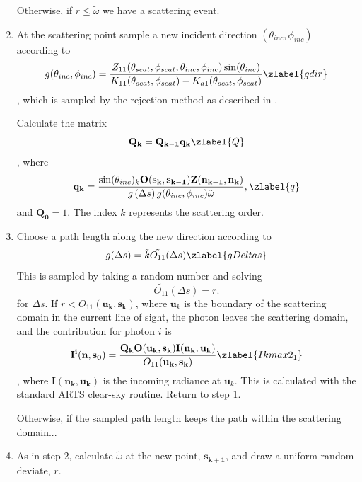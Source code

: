 \begin{enumerate}
Otherwise, if $r\le\tilde{\omega}$
we have a scattering event.
\item
At the scattering point sample a new incident direction
  $(\theta_{inc},\phi_{inc})$ according to 
\begin{equation}
g(\theta_{inc},\phi_{inc})=\frac{Z_{11}(\theta_{scat},\phi_{scat},
\theta_{inc},\phi_{inc})\sin(\theta_{inc})}{K_{11}(\theta_{scat},\phi_{scat})
  - K_{a1}(\theta_{scat},\phi_{scat})}
\zlabel{gdir}
\end{equation}
, which is
sampled by the rejection method as described in \cite{liu:01}.

Calculate the matrix
\begin{equation}
\mathbf{Q_k}=\mathbf{Q_{k-1}q_k}
\zlabel{Q}
\end{equation}
, where
\begin{equation}
\mathbf{q_k}=\frac{\sin(\theta_{inc})_k
  \mathbf{O(s_k,s_{k-1})}\mathbf{Z(n_{k-1},n_k)}}
  {g\left(\Delta s\right)g(\theta_{inc},\phi_{inc}) \tilde{\omega}} ,
\zlabel{q}
\end{equation}
and $\mathbf{Q_0}={1}$. The index $k$ represents the
scattering order.
\item
Choose a path length along the new direction according to
\begin{equation}
g(\Delta s)=\tilde{k}\tilde{O_{11}}(\Delta s)
\zlabel{gDeltas}
\end{equation}
This is sampled by taking a random number and solving 
\begin{equation}
\tilde{O_{11}}(\Delta s)=r.
\end{equation}
for $\Delta s$.
If $r<O_{11}(\mathbf{u_{k},s_k})$, where $\mathbf{u}_{k}$ is the
  boundary of the scattering domain in the current line of sight, the
  photon leaves the scattering domain, and the contribution for photon $i$ is
\begin{equation}
\mathbf{I^i(n,s_0)}=\frac{\mathbf{Q_k}\mathbf{O(u_k,s_k)I(n_k,u_k)}}{O_{11}(\mathbf{u_{k},s_k})}
\zlabel{Ikmax2_1}
\end{equation}
, where 
$\mathbf{I(n_k,u_k)}$ is the incoming radiance at $\mathbf{u}_{k}$.  This is calculated with the standard ARTS clear-sky
routine. Return to step 1.

Otherwise, if the sampled path length keeps the path within the
scattering domain...
\item
As in step 2, calculate 
$\tilde{\omega}$ at the new point, $\mathbf{s_{k+1}}$, and draw a uniform
  random deviate, $r$.


\end{enumerate}
